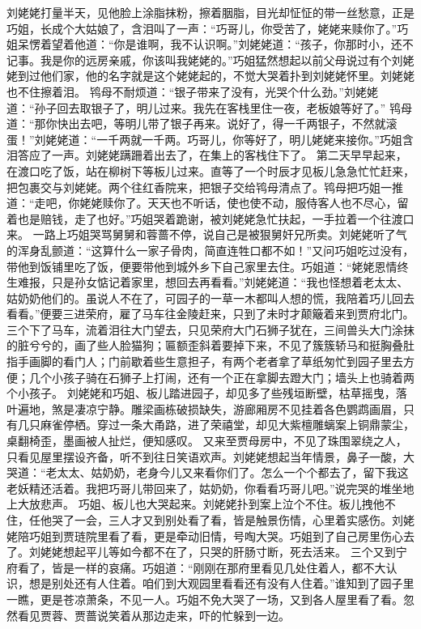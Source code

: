\documentclass[12pt,oneside]{book}
\begin{document}
刘姥姥打量半天，见他脸上涂脂抹粉，擦着胭脂，目光却怔怔的带一丝愁意，正是巧姐，长成个大姑娘了，含泪叫了一声：“巧哥儿，你受苦了，姥姥来赎你了。”巧姐呆愣着望着他道：“你是谁啊，我不认识啊。”刘姥姥道：“孩子，你那时小，还不记事。我是你的远房亲戚，你该叫我姥姥的。”巧姐猛然想起以前父母说过有个刘姥姥到过他们家，他的名字就是这个姥姥起的，不觉大哭着扑到刘姥姥怀里。刘姥姥也不住擦着泪。
鸨母不耐烦道：“银子带来了没有，光哭个什么劲。”刘姥姥道：“孙子回去取银子了，明儿过来。我先在客栈里住一夜，老板娘等好了。”
鸨母道：“那你快出去吧，等明儿带了银子再来。说好了，得一千两银子，不然就滚蛋！”刘姥姥道：“一千两就一千两。巧哥儿，你等好了，明儿姥姥来接你。”巧姐含泪答应了一声。刘姥姥蹒跚着出去了，在集上的客栈住下了。
第二天早早起来，在渡口吃了饭，站在柳树下等板儿过来。直等了一个时辰才见板儿急急忙忙赶来，把包裹交与刘姥姥。两个往红香院来，把银子交给鸨母清点了。鸨母把巧姐一推道：“走吧，你姥姥赎你了。天天也不听话，使也使不动，服侍客人也不尽心，留着也是赔钱，走了也好。”巧姐哭着跪谢，被刘姥姥急忙扶起，一手拉着一个往渡口来。
一路上巧姐哭骂舅舅和蓉蔷不停，说自己是被狠舅奸兄所卖。刘姥姥听了气的浑身乱颤道：“这算什么一家子骨肉，简直连牲口都不如！”又问巧姐吃过没有，带他到饭铺里吃了饭，便要带他到城外乡下自己家里去住。巧姐道：“姥姥恩情终生难报，只是孙女惦记着家里，想回去再看看。”刘姥姥道：“我也怪想着老太太、姑奶奶他们的。虽说人不在了，可园子的一草一木都叫人想的慌，我陪着巧儿回去看看。”便要三进荣府，雇了马车往金陵赶来，只到了未时才颠簸着来到贾府北门。
三个下了马车，流着泪往大门望去，只见荣府大门石狮子犹在，三间兽头大门涂抹的脏兮兮的，画了些人脸猫狗；匾额歪斜着要掉下来，不见了簇簇轿马和挺胸叠肚指手画脚的看门人；门前歇着些生意担子，有两个老者拿了草纸匆忙到园子里去方便；几个小孩子骑在石狮子上打闹，还有一个正在拿脚去蹬大门；墙头上也骑着两个小孩子。
刘姥姥和巧姐、板儿踏进园子，却见多了些残垣断壁，枯草摇曳，落叶遍地，煞是凄凉宁静。雕梁画栋破损缺失，游廊厢房不见挂着各色鹦鹉画眉，只有几只麻雀停栖。穿过一条大甬路，进了荣禧堂，却见大紫檀雕螭案上铜鼎蒙尘，桌翻椅歪，墨画被人扯烂，便知感叹。
又来至贾母房中，不见了珠围翠绕之人，只看见屋里摆设齐备，听不到往日笑语欢声。刘姥姥想起当年情景，鼻子一酸，大哭道：“老太太、姑奶奶，老身今儿又来看你们了。怎么一个个都去了，留下我这老妖精还活着。我把巧哥儿带回来了，姑奶奶，你看看巧哥儿吧。”说完哭的堆坐地上大放悲声。
巧姐、板儿也大哭起来。刘姥姥扑到案上泣个不住。板儿拽他不住，任他哭了一会，三人才又到别处看了看，皆是触景伤情，心里着实感伤。刘姥姥陪巧姐到贾琏院里看了看，更是牵动旧情，号啕大哭。巧姐到了自己房里伤心去了。刘姥姥想起平儿等如今都不在了，只哭的肝肠寸断，死去活来。
三个又到宁府看了，皆是一样的哀痛。巧姐道：“刚刚在那府里看见几处住着人，都不大认识，想是别处还有人住着。咱们到大观园里看看还有没有人住着。”谁知到了园子里一瞧，更是苍凉萧条，不见一人。巧姐不免大哭了一场，又到各人屋里看了看。忽然看见贾蓉、贾蔷说笑着从那边走来，吓的忙躲到一边。
\end{document}

